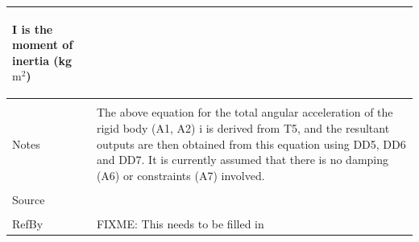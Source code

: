 \documentclass[12pt]{article}
\begin{document}
\begin{minipage}{\textwidth}
\begin{tabular}{p{} p{}}
\begin{symbDescription}
              \item{$\mathbf{I}$ is the moment of inertia (kg$\text{m}^{2}$)}
              \end{symbDescription}
\\ \midrule \\
Notes & The above equation for the total angular acceleration of the rigid body (A1, A2) i is derived from T5, and the resultant outputs are then obtained from this equation using DD5, DD6 and DD7. It is currently assumed that there is no damping (A6) or constraints (A7) involved.
\\ \midrule \\
Source & 
\\ \midrule \\
RefBy & FIXME: This needs to be filled in
\\ \bottomrule \end{tabular}
\end{minipage}\\
~\newline
\end{document}
